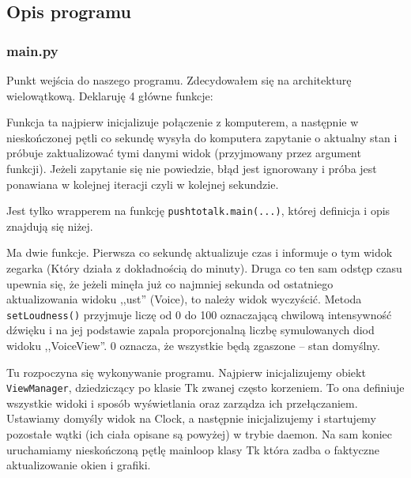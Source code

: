 \documentclass[declaration,shortabstract, inz]{iithesis}
\begin{document}
\subsection{Opis programu}
\subsubsection{main.py}
% 
    Punkt wejścia do naszego programu. Zdecydowałem się na architekturę wielowątkową. Deklaruję 4 główne funkcje:
    \begin{description}[style=nextline]
        \item[computer\textunderscore{}process]
            Funkcja ta najpierw inicjalizuje połączenie z komputerem, a następnie w nieskończonej pętli co sekundę wysyła do komputera zapytanie o aktualny stan i próbuje zaktualizować tymi danymi widok (przyjmowany przez argument funkcji). Jeżeli zapytanie się nie powiedzie, błąd jest ignorowany i próba jest ponawiana w kolejnej iteracji czyli w kolejnej sekundzie.
        \item[assistant\textunderscore{}process]
            Jest tylko wrapperem na funkcję \texttt{pushtotalk.main(...)}, której definicja i opis znajdują się niżej.
        \item[clock\textunderscore{}process]
            Ma dwie funkcje. Pierwsza co sekundę aktualizuje czas i informuje o tym widok zegarka (Który działa z dokładnością do minuty).
            Druga co ten sam odstęp czasu upewnia się, że jeżeli minęła już co najmniej sekunda od ostatniego aktualizowania widoku ,,ust'' (Voice), to należy widok wyczyścić. Metoda \texttt{setLoudness()} przyjmuje liczę od 0 do 100 oznaczającą chwilową intensywność dźwięku i na jej podstawie zapala proporcjonalną liczbę symulowanych diod widoku ,,VoiceView''. 0 oznacza, że wszystkie będą zgaszone -- stan domyślny.
        \item[main]
            Tu rozpoczyna się wykonywanie programu. Najpierw inicjalizujemy obiekt \texttt{ViewManager}, dziedziczący po klasie Tk zwanej często korzeniem. To ona definiuje wszystkie widoki i sposób wyświetlania oraz zarządza ich przełączaniem.
            Ustawiamy domyśly widok na Clock, a następnie inicjalizujemy i startujemy pozostałe wątki (ich ciała opisane są powyżej) w trybie daemon. Na sam koniec uruchamiamy nieskończoną pętlę mainloop klasy Tk która zadba o faktyczne aktualizowanie okien i grafiki.
    \end{description}
    
\end{document}
